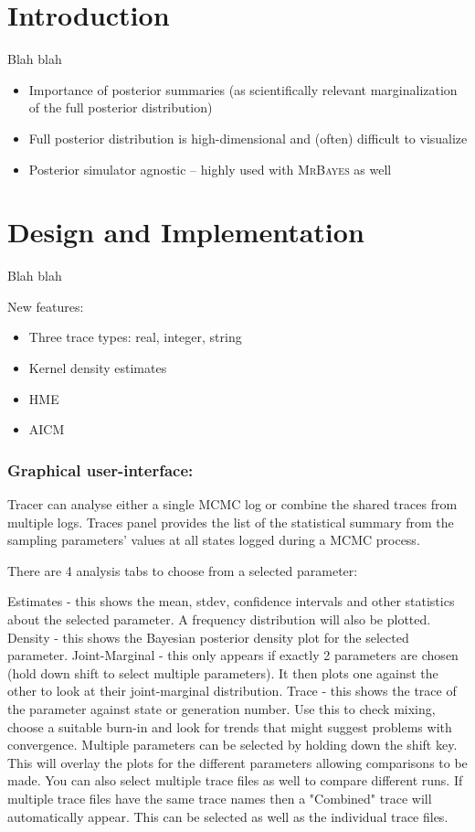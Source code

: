 \documentclass{bioinfo}
\begin{document}
\section*{Introduction}

Blah blah 

\begin{itemize}
\item Importance of posterior summaries (as scientifically relevant marginalization of the full posterior distribution)
\item Full posterior distribution is high-dimensional and (often) difficult to visualize
\item Posterior simulator agnostic -- highly used with \textsc{MrBayes} as well
\end{itemize}

\section*{Design and Implementation}

Blah blah 

New features:
\begin{itemize}
\item Three trace types: real, integer, string
\item Kernel density estimates
\item HME
\item AICM
\end{itemize}

\subsubsection*{Graphical user-interface:}

Tracer can analyse either a single MCMC log or combine the shared traces from multiple logs. Traces panel provides the list of the statistical summary from the sampling parameters' values at all states logged during a MCMC process. 

There are 4 analysis tabs to choose from a selected parameter:

Estimates - this shows the mean, stdev, confidence intervals and other statistics about the selected parameter. A frequency distribution will also be plotted.
Density - this shows the Bayesian posterior density plot for the selected parameter.
Joint-Marginal - this only appears if exactly 2 parameters are chosen (hold down shift to select multiple parameters). It then plots one against the other to look at their joint-marginal distribution.
Trace - this shows the trace of the parameter against state or generation number. Use this to check mixing, choose a suitable burn-in and look for trends that might suggest problems with convergence.
Multiple parameters can be selected by holding down the shift key. This will overlay the plots for the different parameters allowing comparisons to be made. You can also select multiple trace files as well to compare different runs. If multiple trace files have the same trace names then a "Combined" trace will automatically appear. This can be selected as well as the individual trace files.
\end{document}
